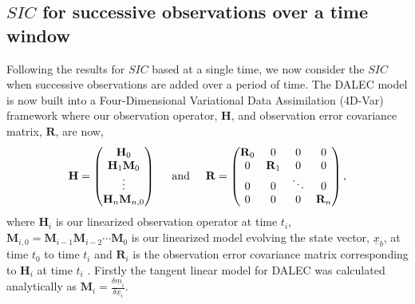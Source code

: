 \documentclass[11pt]{article}
\begin{document}
\subsection{$SIC$ for successive observations over a time window}

Following the results for $SIC$ based at a single time, we now consider the $SIC$ when successive observations are added over a period of time. The DALEC model is now built into a Four-Dimensional Variational Data Assimilation (4D-Var) framework where our observation operator, $\mathbf{H}$, and observation error covariance matrix, $\mathbf{R}$, are now,
\[ 
\mathbf{H}=
\begin{pmatrix}
\mathbf{H}_0 \\
\mathbf{H}_1\mathbf{M}_0\\
\vdots \\
\mathbf{H}_n\mathbf{M}_{n,0}
\end{pmatrix}
\hspace{5mm} \text{and} \hspace{5mm}
\mathbf{R}=
\begin{pmatrix}
\mathbf{R}_0 & 0 & 0 & 0 \\
0 & \mathbf{R}_1 & 0 & 0 \\
0 & 0 & \ddots & 0 \\
0 & 0 & 0 & \mathbf{R}_n
\end{pmatrix},
\]
where $\mathbf{H}_i$ is our linearized observation operator at time $t_i$, $\mathbf{M}_{i,0}=\mathbf{M}_{i-1}\mathbf{M}_{i-2}\cdots\mathbf{M}_0$ is our linearized model evolving the state vector, $\underline{x}_b$, at time $t_0$ to time $t_i$ and $\mathbf{R}_i$ is the observation error covariance matrix corresponding to $\mathbf{H}_i$ at time $t_i$ \cite{lewis2006dynamic}. Firstly the tangent linear model for DALEC was calculated analytically as $\mathbf{M}_i=\frac{\delta \underline{m}_i}{\delta \underline{x}_i}$.
\end{document}
